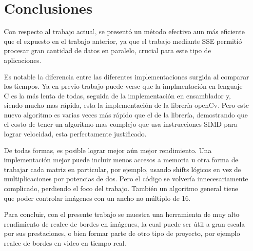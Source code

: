 
\section{Conclusiones}

Con respecto al trabajo actual, se present\'o un m\'etodo efectivo aun m\'as  eficiente que el expuesto en el trabajo anterior, ya que el trabajo mediante SSE permiti\'o procesar gran cantidad de datos en paralelo, crucial para este tipo de aplicaciones.


	Es notable la diferencia entre las diferentes implementaciones surgida al comparar los tiempos. Ya en previo trabajo puede verse que la implmentaci\'on en lenguaje C es la m\'as lenta de todas, seguida de la implementaci\'on en ensamblador y, siendo mucho mas r\'apida, esta la implementaci\'on de la librer\'ia openCv. Pero este nuevo algoritmo es varias veces m\'as r\'apido que el de la librer\'ia, demostrando que el costo de tener un algoritmo mas complejo que usa instrucciones SIMD para lograr velocidad, esta perfectamente justificado. 

	
	De todas formas, es posible lograr mejor a\'un mejor rendimiento. Una implementaci\'on mejor puede incluir menos accesos a memoria u otra forma de trabajar cada matriz en particular, por ejemplo, usando shifts l\'ogicos en vez de multiplicaciones por potencias de dos. Pero el c\'odigo se volver\'ia innecesariamente complicado, perdiendo el foco del trabajo. Tambi\'en un algoritmo general tiene que poder controlar im\'agenes con un ancho no m\'ultiplo de 16.


	Para concluir, con el presente trabajo se muestra una herramienta de muy alto rendimiento de realce de bordes en im\'agenes, la cual puede ser \'util a gran escala por sus prestaciones, o bien formar parte de otro tipo de proyecto, por ejemplo realce de bordes en video en tiempo real.

\pagebreak	


